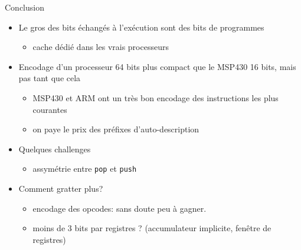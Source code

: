 \documentclass[slidetop,11pt,table]{beamer}
\begin{document}
%   
%   

\begin{frame}{Conclusion}
  \begin{itemize}
  \item Le gros des bits échangés à l'exécution sont des bits de programmes
    \begin{itemize}
    \item cache dédié dans les vrais processeurs
    \end{itemize}
  \item Encodage d'un processeur 64 bits plus compact que le MSP430 16 bits, mais pas tant que cela
    \begin{itemize}
    \item MSP430 et ARM ont un très bon encodage des instructions les plus courantes
    \item on paye le prix des préfixes d'auto-description
    \end{itemize}
  \item Quelques challenges
    \begin{itemize}
    \item assymétrie entre \texttt{pop} et \texttt{push}
    \end{itemize}
  \item Comment gratter plus?
    \begin{itemize}
    \item encodage des opcodes: sans doute peu à gagner.
    \item moins de 3 bits par registres ? (accumulateur implicite, fenêtre de registres)
    \end{itemize}
  \end{itemize}

\end{frame}
\end{document}
